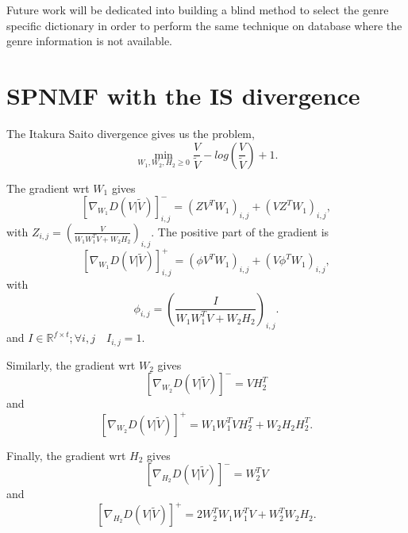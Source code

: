 \documentclass{article}
\begin{document}
Future work will be dedicated into building a blind method to select the genre specific dictionary in order to perform the same technique on database where the genre information is not available. 



\section{SPNMF with the IS divergence}\label{ISdisteq}
 
The Itakura Saito divergence gives us the problem,
$$\min_{W_1,W_2,H_2 \geq 0} \frac{V}{\tilde{V}} - log(\frac{V}{\tilde{V}}) +1.$$

The gradient wrt $W_1$ gives
$$[\nabla_{W_1} D(V|\tilde{V})]_{i,j}^{-} = (ZV^TW_1)_{i,j} + (VZ^TW_1)_{i,j},$$
with $Z_{i,j} = (\frac{V}{W_1W_1^TV + W_2H_2})_{i,j}$. 
The positive part of the gradient is
$$[\nabla_{W_1} D(V|\tilde{V})]_{i,j}^{+} = (\phi V^TW_1)_{i,j} + (V \phi^T W_1)_{i,j},$$
with $$ \phi_{i,j} = (\frac{I}{W_1W_1^TV + W_2H_2})_{i,j}.$$ and $I \in \mathbb{R}^{f \times t} ; \forall i,j \quad I_{i,j}=1$.


Similarly, the gradient wrt $W_2$ gives
$$ [\nabla_{W_2} D(V|\tilde{V})]^{-} = VH_2^T $$
and
$$ [\nabla_{W_2} D(V|\tilde{V})]^{+} = W_1W_1^TVH_2^T + W_2H_2H_2^T.$$

Finally, the gradient wrt $H_2$ gives
$$ [\nabla_{H_2} D(V|\tilde{V})]^{-} = W_2^TV  $$
and
$$ [\nabla_{H_2} D(V|\tilde{V})]^{+} = 2W_2^TW_1W_1^TV + W_2^TW_2H_2. $$





\end{document}
